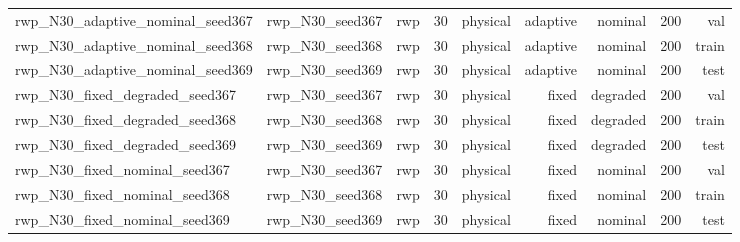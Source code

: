 \begin{tabular}{lrrrrrrrr}
rwp\_N30\_adaptive\_nominal\_seed367 & rwp\_N30\_seed367 & rwp & 30 & physical & adaptive & nominal & 200 & val \\
rwp\_N30\_adaptive\_nominal\_seed368 & rwp\_N30\_seed368 & rwp & 30 & physical & adaptive & nominal & 200 & train \\
rwp\_N30\_adaptive\_nominal\_seed369 & rwp\_N30\_seed369 & rwp & 30 & physical & adaptive & nominal & 200 & test \\
rwp\_N30\_fixed\_degraded\_seed367 & rwp\_N30\_seed367 & rwp & 30 & physical & fixed & degraded & 200 & val \\
rwp\_N30\_fixed\_degraded\_seed368 & rwp\_N30\_seed368 & rwp & 30 & physical & fixed & degraded & 200 & train \\
rwp\_N30\_fixed\_degraded\_seed369 & rwp\_N30\_seed369 & rwp & 30 & physical & fixed & degraded & 200 & test \\
rwp\_N30\_fixed\_nominal\_seed367 & rwp\_N30\_seed367 & rwp & 30 & physical & fixed & nominal & 200 & val \\
rwp\_N30\_fixed\_nominal\_seed368 & rwp\_N30\_seed368 & rwp & 30 & physical & fixed & nominal & 200 & train \\
rwp\_N30\_fixed\_nominal\_seed369 & rwp\_N30\_seed369 & rwp & 30 & physical & fixed & nominal & 200 & test \\
\bottomrule
\end{tabular}